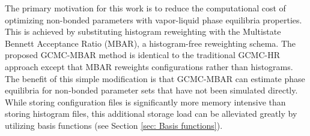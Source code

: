 \documentclass[journal=jced,manuscript=article]{achemso}
\begin{document}



The primary motivation for this work is to reduce the computational cost of optimizing non-bonded parameters with vapor-liquid phase equilibria properties. This is achieved by substituting histogram reweighting with the Multistate Bennett Acceptance Ratio (MBAR), \cite{chodera:jctc:2007,shirts-chodera:jcp:2008:mbar} a histogram-free reweighting schema. The proposed GCMC-MBAR method is identical to the traditional GCMC-HR approach except that MBAR reweights configurations rather than histograms. The benefit of this simple modification is that GCMC-MBAR can estimate phase equilibria for non-bonded parameter sets that have not been simulated directly. While storing configuration files is significantly more memory intensive than storing histogram files, this additional storage load can be alleviated greatly by utilizing basis functions (see Section \ref{sec: Basis functions}).
\end{document}
